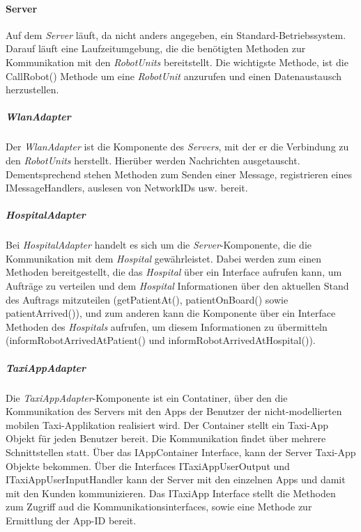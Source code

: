     \paragraph{Server}\label{server}
    		Auf dem \emph{Server} läuft, da nicht anders angegeben, ein Standard-Betriebssystem.
    		Darauf läuft eine Laufzeitumgebung, die die benötigten Methoden zur Kommunikation mit den \emph{RobotUnits} bereitstellt.
    		Die wichtigste Methode, ist die CallRobot() Methode um eine \emph{RobotUnit} anzurufen und einen Datenaustausch herzustellen.
    	\subparagraph{WlanAdapter}\label{wlanadapter}
    		Der \emph{WlanAdapter} ist die Komponente des \emph{Servers}, mit der er die Verbindung zu den \emph{RobotUnits} herstellt. Hierüber werden Nachrichten ausgetauscht.
    		Dementsprechend stehen Methoden zum Senden einer Message, registrieren eines IMessageHandlers, auslesen von NetworkIDs usw. bereit.
    	\subparagraph{HospitalAdapter}\label{hospital}
    		Bei \emph{HospitalAdapter} handelt es sich um die \emph{Server}-Komponente, die die Kommunikation mit dem \emph{Hospital} gewährleistet.
    		Dabei werden zum einen Methoden bereitgestellt, die das \emph{Hospital} über ein Interface aufrufen kann, um Aufträge zu verteilen und dem \emph{Hospital} Informationen über den aktuellen Stand des Auftrags mitzuteilen (getPatientAt(), patientOnBoard() sowie patientArrived()), und zum anderen kann die Komponente über ein Interface Methoden des \emph{Hospitals} aufrufen, um diesem Informationen zu übermitteln (informRobotArrivedAtPatient() und informRobotArrivedAtHospital()).
      \subparagraph{TaxiAppAdapter}
      Die \emph{TaxiAppAdapter}-Komponente ist ein Contatiner, über den die Kommunikation des Servers mit den Apps der Benutzer der nicht-modellierten mobilen Taxi-Applikation realisiert wird.
      Der Container stellt ein Taxi-App Objekt für jeden Benutzer bereit.
      Die Kommunikation findet über mehrere Schnittstellen statt.
      Über das IAppContainer Interface, kann der Server Taxi-App Objekte bekommen.
      Über die Interfaces ITaxiAppUserOutput und ITaxiAppUserInputHandler kann der Server mit den einzelnen Apps und damit mit den Kunden kommunizieren.
      Das ITaxiApp Interface stellt die Methoden zum Zugriff aud die Kommunikationsinterfaces, sowie eine Methode zur Ermittlung der App-ID bereit.
